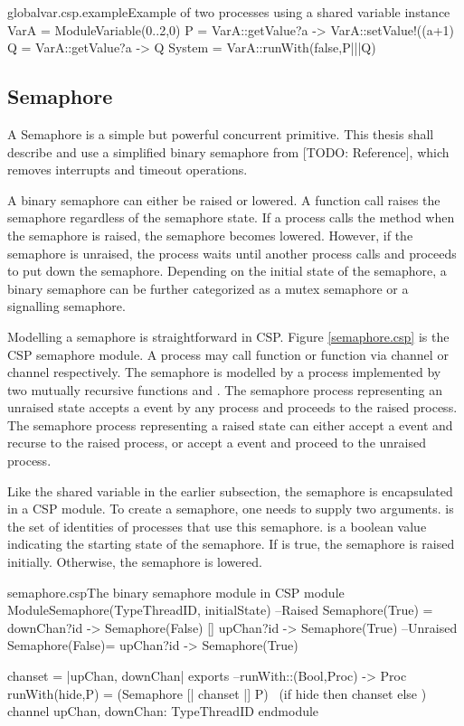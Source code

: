 \documentclass{article}
\begin{document}
\begin{cspinline}{globalvar.csp.example}{Example of two processes using a shared variable}
instance VarA = ModuleVariable({0..2},0)
P = VarA::getValue?a -> VarA::setValue!((a+1)%
Q = VarA::getValue?a -> Q
System = VarA::runWith(false,P|||Q)
\end{cspinline}


\subsection{Semaphore}
A Semaphore is a simple but powerful concurrent primitive. This thesis shall describe and use a simplified binary semaphore from [TODO: Reference], which removes interrupts and timeout operations. 

A binary semaphore can either be raised or lowered. A  function call raises the semaphore regardless of the semaphore state. If a process calls the  method when the semaphore is raised, the semaphore becomes lowered. However, if the semaphore is unraised, the process waits until another process calls  and proceeds to put down the semaphore. Depending on the initial state of the semaphore, a binary semaphore can be further categorized as a mutex semaphore or a signalling semaphore.

Modelling a semaphore is straightforward in CSP. Figure \ref{semaphore.csp} is the CSP semaphore module. A process may call  function or  function via channel  or channel  respectively. The semaphore is modelled by a process implemented by two mutually recursive functions  and . The semaphore process representing an unraised state accepts a  event by any process and proceeds to the raised process. The semaphore process representing a raised state can either accept a  event and recurse to the raised process, or accept a  event and proceed to the unraised process.

Like the shared variable in the earlier subsection, the semaphore is encapsulated in a CSP module. To create a semaphore, one needs to supply two arguments.  is the set of identities of processes that use this semaphore.  is a boolean value indicating the starting state of the semaphore. If  is true, the semaphore is raised initially. Otherwise, the semaphore is lowered. 
\begin{cspfloat}{semaphore.csp}{The binary semaphore module in CSP}
module ModuleSemaphore(TypeThreadID, initialState)
  --Raised
  Semaphore(True) = downChan?id -> Semaphore(False)
                   [] upChan?id -> Semaphore(True)
  --Unraised
  Semaphore(False)= upChan?id   -> Semaphore(True)
  
  chanset = {|upChan, downChan|}
exports
  --runWith::(Bool,Proc) -> Proc
  runWith(hide,P) = (Semaphore [| chanset |] P) \ 
                     (if hide then chanset else {})
  channel upChan, downChan: TypeThreadID
endmodule
\end{cspfloat}
\end{document}
